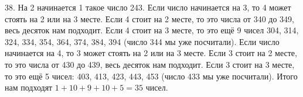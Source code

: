 38. На 2 начинается 1 такое число 243. Если число начинается на 3, то 4 может стоять на 2 или на 3 месте. Если 4 стоит на 2 месте, то это числа от 340 до 349, весь десяток нам подходит. Если 4 стоит на 3 месте, то это ещё 9 чисел 304, 314, 324, 334, 354, 364, 374, 384, 394 (число 344 мы уже посчитали). Если число начинается на 4, то 3 может стоять на 2 или на 3 месте. Если 3 стоит на 2 месте, то это числа от 430 до 439, весь десяток нам подходит. Если 3 стоит на 3 месте, то это ещё 5 чисел: 403, 413, 423, 443, 453 (число 433 мы уже посчитали). Итого нам подходят $1+10+9+10+5=35$ чисел.\\
